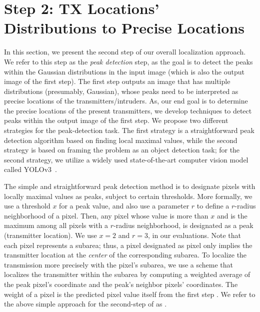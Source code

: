 \section{\bf \our Step 2: TX Locations' Distributions to Precise Locations}
\label{sec:detect}

In this section, we present the second step of our overall localization approach. We refer to
this step as the {\em peak detection} step, as the goal is to detect the peaks within the 
Gaussian distributions in the input image (which is also the output image of the first step).
The first step outputs an image that has multiple distributions (presumably, Gaussian), whose
peaks need to be interpreted as precise locations of the transmitters/intruders.
As, our end goal is to determine the precise locations of the present transmitters, we develop techniques to detect peaks within  the output image of the first step. 
We propose two different strategies for the peak-detection task. The first strategy is a straightforward peak detection algorithm based on finding local maximal values, while the 
second strategy is based on framing the problem as an object detection task; for the second strategy, we utilize a widely used state-of-the-art computer vision model called YOLOv3~\cite{yolov3}.

The simple and straightforward peak detection method is to designate pixels with
locally maximal values as peaks, subject to certain thresholds.
More formally, we use a threshold $x$ for a peak value, and also use a parameter $r$ to define a $r$-radius neighborhood of a pixel. 
Then, any pixel whose value is more than $x$ and is the maximum among all pixels with a $r$-radius neighborhood, is designated as a peak (transmitter location). 
We use $x=2$ and $r=3$, in our evaluations.
Note that each pixel represents a subarea; thus, a pixel designated as pixel only 
implies the transmitter location at the {\em center} of the corresponding subarea.
To localize the transmission more precisely with the pixel's subarea, we use a scheme that localizes the transmitter within the subarea by computing a weighted average of the peak pixel's coordinate and the peak's neighbor pixels' coordinates.
The weight of a pixel is the predicted pixel value itself from the first step \imgimg.
We refer to the above simple approach for the second-step of \our as \simpeak.

